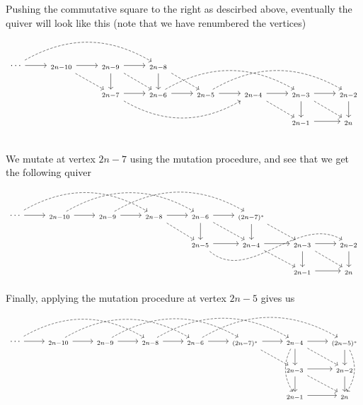 \documentclass[12pt, dvipsnames, oneside]{amsart}
\theoremstyle{definition}
\begin{document}
Pushing the commutative square to the right as descirbed above, eventually the quiver will look like this (note that we have renumbered the vertices)
 \begin{equation*}
\begin{tikzcd}
\cdots \arrow[r] \arrow[rrr, bend left, dashed] & _{2n-10} \arrow[r] \arrow[dr, dashed]& _{2n-9} \arrow[r] \arrow[d] \arrow[dr, dashed] & _{2n-8} \arrow[d] \arrow[dr, dashed] & & & & \\
& & _{2n-7} \arrow[r] \arrow[rrr, bend right, dashed] & _{2n-6} \arrow[r] \arrow[rrr, bend left, dashed] & _{2n-5} \arrow[r] \arrow[rrr, bend left, dashed] & _{2n-4} \arrow[r] \arrow[dr, dashed] & _{2n-3} \arrow[d] \arrow[r] \arrow[dr, dashed] & _{2n-2} \arrow[d] \\
& & & & & & _{2n-1} \arrow[r] & _{2n} \\
& & & & & & &
\end{tikzcd}
\end{equation*}
We mutate at vertex $2n-7$ using the mutation procedure, and see that we get the following quiver
\begin{equation*}
\begin{tikzcd}
\cdots \arrow[r] \arrow[rrr, bend left, dashed] & _{2n-10} \arrow[r] \arrow[rrr, bend left, dashed] & _{2n-9} \arrow[r] \arrow[rrr, bend left, dashed] & _{2n-8} \arrow[r] \arrow[dr, dashed] & _{2n-6} \arrow[d] \arrow[r] \arrow[dr, dashed] & _{(2n-7)^*} \arrow[d] \arrow[dr, dashed] & & \\
& & & & _{2n-5} \arrow[r] \arrow[rrr, out=-40, in=150, dashed] & _{2n-4} \arrow[r] \arrow[dr, dashed] & _{2n-3} \arrow[d] \arrow[r] \arrow[dr, dashed] & _{2n-2} \arrow[d] \\
& & & & & & _{2n-1} \arrow[r] & _{2n} 
\end{tikzcd}
\end{equation*}
Finally, applying the mutation procedure at vertex $2n-5$ gives us
\begin{equation*}
\begin{tikzcd}
\cdots \arrow[r] \arrow[rrr, bend left, dashed] & _{2n-10} \arrow[r] \arrow[rrr, bend left, dashed] & _{2n-9} \arrow[r] \arrow[rrr, bend left, dashed] & _{2n-8} \arrow[r] \arrow[rrr, bend left, dashed] & _{2n-6} \arrow[r] \arrow[rrr, bend left, dashed] & _{(2n-7)^*} \arrow[r] \arrow[dr, dashed] & _{2n-4} \arrow[d] \arrow[r] \arrow[dr, dashed] \arrow[dd, bend right, dashed] & _{(2n-5)^*} \arrow[d] \arrow[dd, bend left, dashed] \\
& & & & & & _{2n-3} \arrow[d] \arrow[r] \arrow[dr, dashed] & _{2n-2} \arrow[d] \\
& & & & & & _{2n-1} \arrow[r] & _{2n} 
\end{tikzcd}
\end{equation*}
\end{document}
